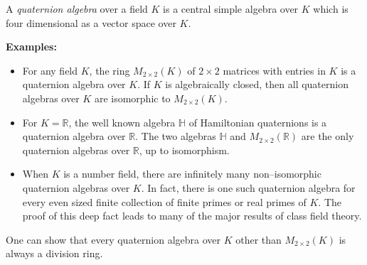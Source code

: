 \documentclass[12pt]{article}
\begin{document}
A {\em quaternion algebra} over a field $K$ is a central simple algebra over $K$ which is four dimensional as a vector space over $K$.

{\bf Examples:}

\begin{itemize}
\item For any field $K$, the ring $M_{2\times 2}(K)$ of $2\times 2$ matrices with entries in $K$ is a quaternion algebra over $K$. If $K$ is algebraically closed, then all quaternion algebras over $K$ are isomorphic to $M_{2\times 2}(K)$.
\item For $K = \mathbb{R}$, the well known algebra $\mathbb{H}$ of Hamiltonian quaternions is a quaternion algebra over $\mathbb{R}$. The two algebras $\mathbb{H}$ and $M_{2 \times 2}(\mathbb{R})$ are the only quaternion algebras over $\mathbb{R}$, up to isomorphism.
\item When $K$ is a number field, there are infinitely many non--isomorphic quaternion algebras over $K$. In fact, there is one such quaternion algebra for every even sized finite collection of finite primes or real primes of $K$. The proof of this deep fact leads to many of the major results of class field theory.
\end{itemize}

One can show that every quaternion algebra over $K$ other than $M_{2\times 2}(K)$ is always a division ring.
\end{document}
